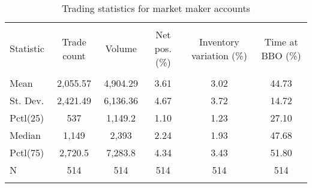 
\begin{table}[!htbp] \centering 
  \caption{Trading statistics for market maker accounts} 
  \label{} 
\begin{tabular}{@{\extracolsep{5pt}}lccccc} 
\\[-1.8ex]\hline 
\hline \\[-1.8ex] 
Statistic & Trade count & Volume & Net pos. (\%) & Inventory variation (\%) & Time at BBO (\%) \\ 
\hline \\[-1.8ex] 
Mean & 2,055.57 & 4,904.29 & 3.61 & 3.02 & 44.73 \\ 
St. Dev. & 2,421.49 & 6,136.36 & 4.67 & 3.72 & 14.72 \\ 
Pctl(25) & 537 & 1,149.2 & 1.10 & 1.23 & 27.10 \\ 
Median & 1,149 & 2,393 & 2.24 & 1.93 & 47.68 \\ 
Pctl(75) & 2,720.5 & 7,283.8 & 4.34 & 3.43 & 51.80 \\ 
N & 514 & 514 & 514 & 514 & 514 \\ 
\hline \\[-1.8ex] 
\end{tabular} 
\end{table} 
